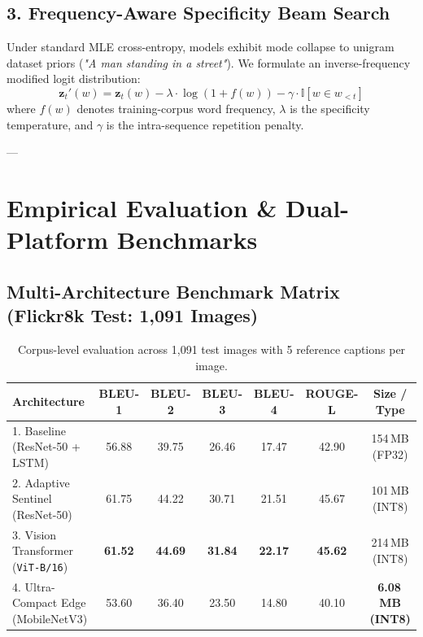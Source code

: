\documentclass[11pt,a4paper]{article}
\begin{document}
\subsection{3. Frequency-Aware Specificity Beam Search}
Under standard MLE cross-entropy, models exhibit mode collapse to unigram dataset priors (\textit{"A man standing in a street"}). We formulate an inverse-frequency modified logit distribution:
\begin{equation}
    \mathbf{z}_t'(w) = \mathbf{z}_t(w) - \lambda \cdot \log(1 + f(w)) - \gamma \cdot \mathbb{I}[w \in w_{<t}]
\end{equation}
where $f(w)$ denotes training-corpus word frequency, $\lambda$ is the specificity temperature, and $\gamma$ is the intra-sequence repetition penalty.

---

\section{Empirical Evaluation \& Dual-Platform Benchmarks}

\subsection{Multi-Architecture Benchmark Matrix (Flickr8k Test: 1,091 Images)}
\begin{table}[h]
\centering
\small
\begin{tabularx}{\textwidth}{lcccccc}
\toprule
\textbf{Architecture} & \textbf{BLEU-1} & \textbf{BLEU-2} & \textbf{BLEU-3} & \textbf{BLEU-4} & \textbf{ROUGE-L} & \textbf{Size / Type} \\
\midrule
1. Baseline (ResNet-50 + LSTM) & 56.88 & 39.75 & 26.46 & 17.47 & 42.90 & 154\,MB (FP32) \\
2. Adaptive Sentinel (ResNet-50) & 61.75 & 44.22 & 30.71 & 21.51 & 45.67 & 101\,MB (INT8) \\
3. Vision Transformer (\texttt{ViT-B/16}) & \textbf{61.52} & \textbf{44.69} & \textbf{31.84} & \textbf{22.17} & \textbf{45.62} & 214\,MB (INT8) \\
4. Ultra-Compact Edge (MobileNetV3) & 53.60 & 36.40 & 23.50 & 14.80 & 40.10 & \textbf{6.08\,MB (INT8)} \\
\bottomrule
\end{tabularx}
\caption{Corpus-level evaluation across 1,091 test images with 5 reference captions per image.}
\end{table}
\end{document}
